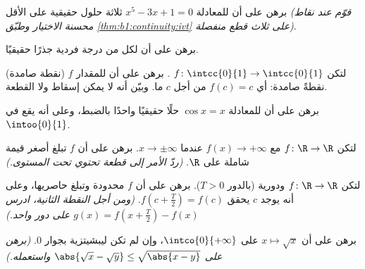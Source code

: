 \begin{exercise}[$\star$]\label{exo:b1:continuity:3}
برهن على أن للمعادلة $x^5 - 3x + 1 = 0$ ثلاثة حلول حقيقية على
الأقل \emph{(قوّم عند نقاط محسنة الاختيار وطبّق
\cref{thm:b1:continuity:ivt} على ثلاث قطع منفصلة)}.
\end{exercise}

\begin{exercise}[$\star$]\label{exo:b1:continuity:4}
برهن على أن لكل  من درجة فردية جذرًا حقيقيًا.
\end{exercise}

\begin{exercise}[$\star\star$]\label{exo:b1:continuity:5}
(نقطة صامدة) لتكن $f \colon \intcc{0}{1} \to \intcc{0}{1}$
. برهن على أن للمقدار $f$ نقطةً صامدة: أي $f(c) = c$ من أجل $c$
ما. وبيّن أنه لا يمكن إسقاط  ولا القطعة.
\end{exercise}

\begin{exercise}[$\star\star$]\label{exo:b1:continuity:6}
برهن على أن للمعادلة $\cos x = x$ حلًا حقيقيًا واحدًا بالضبط،
وعلى أنه يقع في $\intoo{0}{1}$.
\end{exercise}

\begin{exercise}[$\star\star$]\label{exo:b1:continuity:7}
لتكن $f \colon \R \to \R$  مع $f(x) \to +\infty$ عندما $x
\to \pm\infty$. برهن على أن $f$ تبلغ أصغر قيمة شاملة على $\R$.
\emph{(ردّ الأمر إلى قطعة تحتوي  تحت المستوى.)}
\end{exercise}

\begin{exercise}[$\star\star$]\label{exo:b1:continuity:8}
لتكن $f \colon \R \to \R$  ودورية (بالدور $T >
0$). برهن على أن $f$ محدودة وتبلغ حاصريها، وعلى أنه
يوجد $c$ يحقق $f(c + \frac T2) = f(c)$. \emph{(ومن أجل النقطة
الثانية، ادرس $g(x) = f(x + \frac T2) - f(x)$ على دور واحد.)}
\end{exercise}

\begin{exercise}[$\star\star$]\label{exo:b1:continuity:9}
برهن على أن $x \mapsto \sqrt x$  على
$\intco{0}{+\infty}$، وإن لم تكن ليبشيتزية بجوار $0$.
\emph{(برهن على $\abs{\sqrt x - \sqrt y} \leq \sqrt{\abs{x -
y}}$ واستعمله.)}
\end{exercise}

